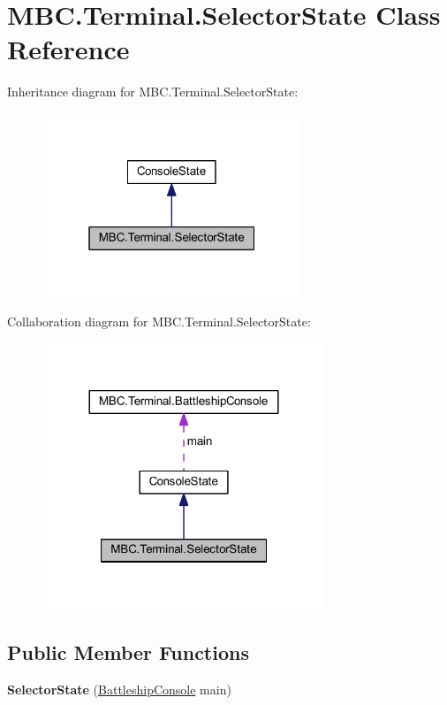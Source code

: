 \hypertarget{class_m_b_c_1_1_terminal_1_1_selector_state}{\section{M\-B\-C.\-Terminal.\-Selector\-State Class Reference}
\label{class_m_b_c_1_1_terminal_1_1_selector_state}
}


Inheritance diagram for M\-B\-C.\-Terminal.\-Selector\-State\-:\nopagebreak
\begin{figure}[H]
\begin{center}
\leavevmode
\includegraphics[width=220pt]{class_m_b_c_1_1_terminal_1_1_selector_state__inherit__graph}
\end{center}
\end{figure}


Collaboration diagram for M\-B\-C.\-Terminal.\-Selector\-State\-:\nopagebreak
\begin{figure}[H]
\begin{center}
\leavevmode
\includegraphics[width=240pt]{class_m_b_c_1_1_terminal_1_1_selector_state__coll__graph}
\end{center}
\end{figure}
\subsection*{Public Member Functions}
\begin{DoxyCompactItemize}
\item 
\hypertarget{class_m_b_c_1_1_terminal_1_1_selector_state_a64a0a29fb6288da77a4eae6fde2442b0}{{\bfseries Selector\-State} (\hyperlink{class_m_b_c_1_1_terminal_1_1_battleship_console}{Battleship\-Console} main)}\label{class_m_b_c_1_1_terminal_1_1_selector_state_a64a0a29fb6288da77a4eae6fde2442b0}

\end{DoxyCompactItemize}

